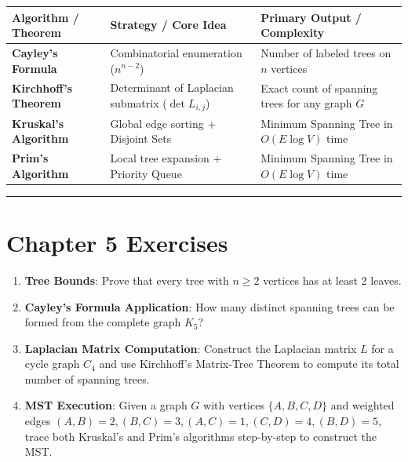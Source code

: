 \documentclass[
]{book}
\newcounter{none} %
\providecommand{\tightlist}{%
  \setlength{\itemsep}{0pt}\setlength{\parskip}{0pt}}
\theoremstyle{definition}
\theoremstyle{definition}
\theoremstyle{definition}
\theoremstyle{definition}
\theoremstyle{remark}
\begin{document}
{\def\LTcaptype{none} %
\begin{longtable}[]{@{}
  >{\raggedright\arraybackslash}p{}
  >{\raggedright\arraybackslash}p{}
  >{\raggedright\arraybackslash}p{}@{}}
\toprule\noalign{}
\begin{minipage}[b]{\linewidth}\raggedright
Algorithm / Theorem
\end{minipage} & \begin{minipage}[b]{\linewidth}\raggedright
Strategy / Core Idea
\end{minipage} & \begin{minipage}[b]{\linewidth}\raggedright
Primary Output / Complexity
\end{minipage} \\
\midrule\noalign{}
\endhead
\bottomrule\noalign{}
\endlastfoot
\textbf{Cayley's Formula} & Combinatorial enumeration (\(n^{n-2}\)) & Number of labeled trees on \(n\) vertices \\
\textbf{Kirchhoff's Theorem} & Determinant of Laplacian submatrix (\(\det L_{i,j}\)) & Exact count of spanning trees for any graph \(G\) \\
\textbf{Kruskal's Algorithm} & Global edge sorting + Disjoint Sets & Minimum Spanning Tree in \(O(E \log V)\) time \\
\textbf{Prim's Algorithm} & Local tree expansion + Priority Queue & Minimum Spanning Tree in \(O(E \log V)\) time \\
\end{longtable}
}

\begin{center}\rule{0.5\linewidth}{0.5pt}\end{center}

\section{Chapter 5 Exercises}\label{chapter-5-exercises}

\begin{enumerate}
\def\labelenumi{\arabic{enumi}.}
\tightlist
\item
  \textbf{Tree Bounds}: Prove that every tree with \(n \ge 2\) vertices has at least 2 leaves.
\item
  \textbf{Cayley's Formula Application}: How many distinct spanning trees can be formed from the complete graph \(K_5\)?
\item
  \textbf{Laplacian Matrix Computation}: Construct the Laplacian matrix \(L\) for a cycle graph \(C_4\) and use Kirchhoff's Matrix-Tree Theorem to compute its total number of spanning trees.
\item
  \textbf{MST Execution}: Given a graph \(G\) with vertices \(\{A, B, C, D\}\) and weighted edges \((A,B)=2, (B,C)=3, (A,C)=1, (C,D)=4, (B,D)=5\), trace both Kruskal's and Prim's algorithms step-by-step to construct the MST.
\end{enumerate}
\end{document}
